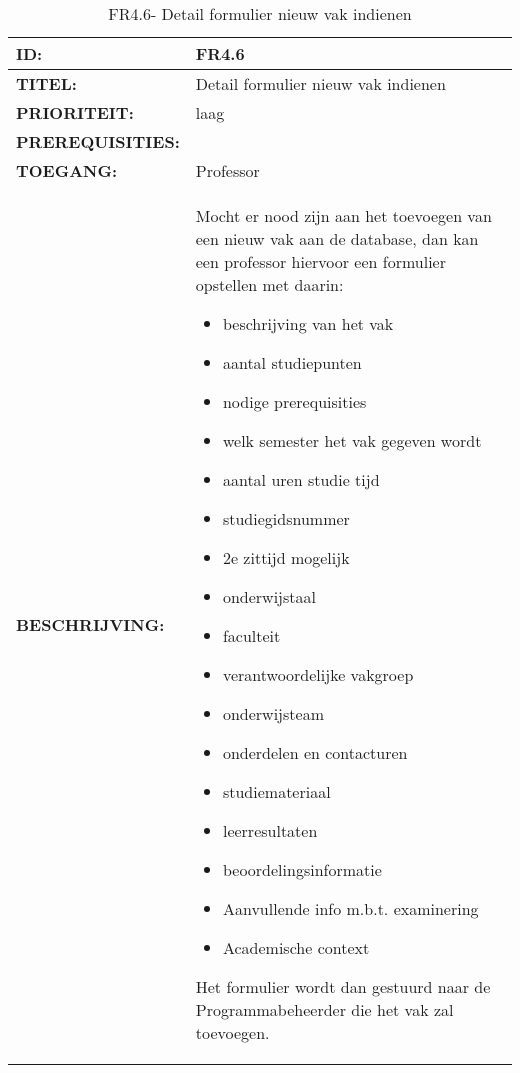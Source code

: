 \noindent\begin{table}[H]
            \begin{tabular}{l | p{10cm}} 
                \textbf{ID:} & FR4.6 \\ \hline
                \textbf{TITEL:} & Detail formulier nieuw vak indienen\\ \hline
                \textbf{PRIORITEIT:} &  laag \\ \hline
                \textbf{PREREQUISITIES:} & \\ \hline
                \textbf{TOEGANG:} & Professor \\ \hline
                \textbf{BESCHRIJVING:} & Mocht er nood zijn aan het toevoegen van een nieuw vak aan de database, dan kan een professor hiervoor een formulier opstellen met daarin:
        \begin{itemize}\itemsep1pt \parskip0pt \parsep0pt
                                        \item beschrijving van het vak
                                        \item aantal studiepunten
                                        \item nodige prerequisities
                                        \item welk semester het vak gegeven wordt
                                        \item aantal uren studie tijd
                                        \item studiegidsnummer
                                        \item 2e zittijd mogelijk
                                        \item onderwijstaal
                                        \item faculteit
                                        \item verantwoordelijke vakgroep
                                        \item onderwijsteam
                                        \item onderdelen en contacturen
                                        \item studiemateriaal
                                        \item leerresultaten
                                        \item beoordelingsinformatie
                                        \item Aanvullende info m.b.t. examinering
                                        \item Academische context
                                        \end{itemize}
                                        Het formulier wordt dan gestuurd naar de Programmabeheerder die het vak zal toevoegen. 
            \end{tabular}\\
            \caption{FR4.6- Detail formulier nieuw vak indienen}
            \label{tab:FR4.6 - Detail formulier nieuw vak indienen}
        \end{table}
        

